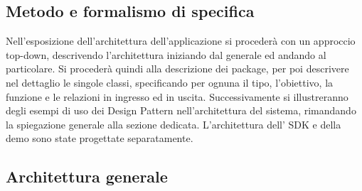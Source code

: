\subsection{Metodo e formalismo di specifica}

Nell’esposizione dell’architettura dell’applicazione si procederà con un approccio top-down, descrivendo l’architettura iniziando dal generale ed andando al particolare.
Si procederà quindi alla descrizione dei package, per poi descrivere
nel dettaglio le singole classi, specificando per ognuna il tipo, l’obiettivo, la funzione e
le relazioni in ingresso ed in uscita.
Successivamente si illustreranno degli esempi di uso dei Design Pattern nell’architettura del sistema, rimandando la spiegazione generale alla sezione dedicata.
L'architettura dell' SDK e della demo sono state progettate separatamente.  

 
\subsection{Architettura generale}


